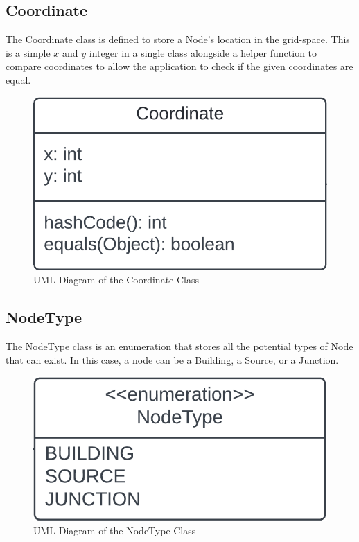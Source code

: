 \subsection{Coordinate}
The Coordinate class is defined to store a Node's location in the grid-space. This is a simple $x$ and $y$ integer in a single class alongside a helper function to compare coordinates to allow the application to check if the given coordinates are equal.
\begin{figure}[H]
    \centering
    \includegraphics[width=0.3\linewidth]{coordinate_diagram.png}
    \caption{UML Diagram of the Coordinate Class}
    \label{fig:coordinate_uml}
\end{figure}

\subsection{NodeType}
The NodeType class is an enumeration that stores all the potential types of Node that can exist. In this case, a node can be a Building, a Source, or a Junction.
\begin{figure}[H]
    \centering
    \includegraphics[width=0.3\linewidth]{nodetype_diagram.png}
    \caption{UML Diagram of the NodeType Class}
    \label{fig:nodetype_uml}
\end{figure}

